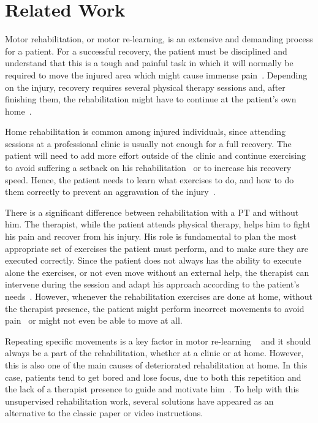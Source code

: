 \chapter{Related Work}
\label{section-related}

Motor rehabilitation, or motor re-learning, is an extensive and demanding process for a patient.
For a successful recovery, the patient must be disciplined and understand that this is a tough and painful task in which it
will normally be required to move the injured area which might cause immense pain~\cite{Singh2014a}.
Depending on the injury, recovery requires several physical therapy sessions and, after finishing them, 
the rehabilitation might have to continue at the patient's own home~\cite{Lohse2013}.

Home rehabilitation is common among injured individuals, since
attending sessions at a professional clinic is usually not enough for a full recovery.
The patient will need to add more effort outside of the clinic and continue 
exercising to avoid suffering a setback on his rehabilitation~\cite{Borghese2013} 
or to increase his recovery speed. 
Hence, the patient needs to learn what exercises to do, and how to do 
them correctly to prevent an aggravation of the injury~\cite{Tang2014a}.

There is a significant difference between rehabilitation with a \ac{PT} and without him.
The therapist, while the patient attends physical therapy, helps him to fight his pain and recover from his injury.
His role is fundamental to plan the most appropriate set of exercises the patient must perform, and to make sure they are executed correctly. 
Since the patient does not always has the ability to execute alone the exercises, or not even move without an external help,
the therapist can intervene during the session and adapt his approach according to the patient's needs~\cite{Sigrist2013}.
However, whenever the rehabilitation exercises are done at home, without the therapist presence, the patient might 
perform incorrect movements to avoid pain~\cite{Tang2014a} or might not even be able to move at all.

Repeating specific movements is a key factor in motor re-learning ~\cite{Schonauer2011a} and it 
should always be a part of the rehabilitation, whether at a clinic or at home.
However, this is also one of the main causes of deteriorated rehabilitation at home. In this case, patients tend to get bored and lose focus, 
due to both this repetition and the lack of a therapist presence to guide and motivate him~\cite{Singh2014a,Balaam2011a,Rego2010}. 
To help with this unsupervised rehabilitation work, several solutions have appeared as 
an alternative to the classic paper or video instructions. 

